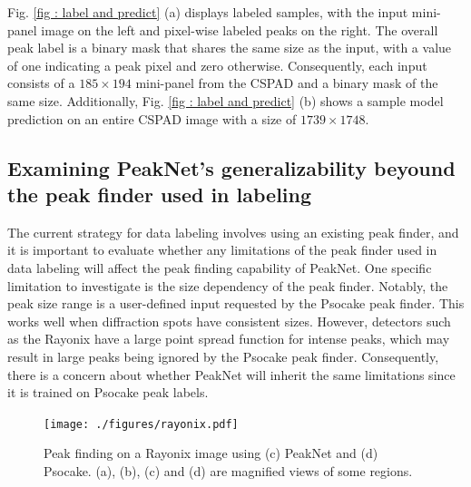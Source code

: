 \documentclass[conference]{IEEEtran}
\newcommand{\peaknet}{PeakNet}
\newcommand{\psocake}{Psocake}
\begin{document}
Fig. \ref{fig : label and predict} (a) displays labeled samples, with the input
mini-panel image on the left and pixel-wise labeled peaks on the right.  The
overall peak label is a binary mask that shares the same size as the input, with
a value of one indicating a peak pixel and zero otherwise.  Consequently, each
input consists of a $185 \times 194$ mini-panel from the CSPAD and a binary mask
of the same size.  Additionally, Fig.  \ref{fig : label and predict} (b) shows a
sample model prediction on an entire CSPAD image with a size of $1739 \times
1748$.  


\subsection{Examining \peaknet{}'s generalizability beyound the peak finder used
in labeling}

The current strategy for data labeling involves using an existing peak finder,
and it is important to evaluate whether any limitations of the peak finder used
in data labeling will affect the peak finding capability of \peaknet{}. One
specific limitation to investigate is the size dependency of the peak finder.
Notably, the peak size range is a user-defined input requested by the \psocake{}
peak finder. This works well when diffraction spots have consistent sizes.
However, detectors such as the Rayonix have a large point spread function for intense peaks, which may
result in large peaks being ignored by the \psocake{} peak finder.  Consequently,
there is a concern about whether \peaknet{} will inherit the same limitations
since it is trained on \psocake{} peak labels.

\begin{figure}[htbp]
\centering
\texttt{[image: ./figures/rayonix.pdf]}
\caption{Peak finding on a Rayonix image using (c) \peaknet{} and (d) \psocake{}.  (a), (b), (c) and (d) are magnified views of some regions.}
\label{fig : rayonix}
\end{figure}
\end{document}
